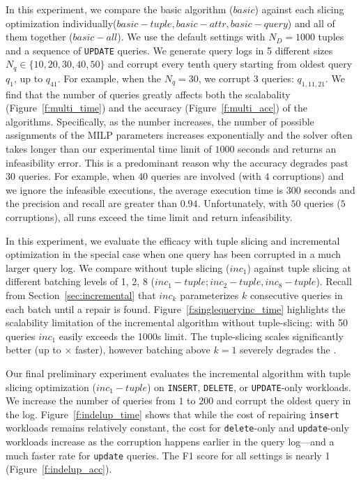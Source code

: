 In this experiment, we compare the basic algorithm ($basic$) against 
each slicing optimization individually($basic-tuple, basic-attr, basic-query$) and all of them together ($basic-all$).  
We use the default settings with $N_D = 1000$ tuples and a sequence of \texttt{UPDATE} queries.
We generate query logs in 5 different sizes $N_q\in \{10, 20, 30, 40, 50\}$ and corrupt 
every tenth query starting from oldest query $q_1$,
up to $q_{41}$.  For example, when the $N_q = {30}$, we corrupt 3 queries: $q_{1,11,21}$. 
We find that the number of queries greatly affects both the scalabality (Figure~\ref{f:multi_time}) 
and the accuracy (Figure~\ref{f:multi_acc}) of the algorithms. Specifically, as the number increases,
the number of possible assignments of the MILP parameters increases exponentially and the solver often takes
longer than our experimental time limit of $1000$ seconds and returns an infeasibility error.  
This is a predominant reason why the accuracy degrades past $30$ queries.  For example, 
when $40$ queries are involved (with $4$ corruptions) 
and we ignore the infeasible executions, the average execution time is $300$ seconds
and the precision and recall are greater than $0.94$.  Unfortunately, with $50$ queries ($5$ corruptions),
all runs exceed the time limit and return infeasibility.

In this experiment, we evaluate the efficacy \sys with tuple slicing and incremental optimization
in the special case when one query has been corrupted in a much larger query log. 
We compare \incremental without tuple slicing ($inc_1$) against tuple slicing at 
different batching levels of 1, 2, 8 ($inc_1-tuple; inc_2-tuple, inc_8-tuple$). 
Recall from Section~\ref{sec:incremental} that $inc_k$ parameterizes $k$ consecutive queries in each batch until a repair is found.
Figure~\ref{f:singlequeryinc_time} highlights the scalability limitation of the incremental 
algorithm without tuple-slicing: with 50 queries $inc_1$  easily exceeds the 1000s limit.   
The tuple-slicing scales significantly better (up to $\times$ faster), however
batching above $k=1$ severely degrades the .


\label{sec:indelup}
Our final preliminary experiment evaluates the incremental algorithm with tuple slicing optimization 
($inc_1-tuple$) on \texttt{INSERT}, \texttt{DELETE}, or \texttt{UPDATE}-only workloads.
We increase the number of queries from $1$ to $200$ and corrupt the oldest query in the log.  
Figure~\ref{f:indelup_time} shows that while the cost of repairing \texttt{insert} workloads
remains relatively constant, the cost for \texttt{delete}-only and \texttt{update}-only workloads increase as 
the corruption happens earlier in the query log---and a much faster rate for \texttt{update} queries.
The F1 score for all settings is nearly 1 (Figure~\ref{f:indelup_acc}).


